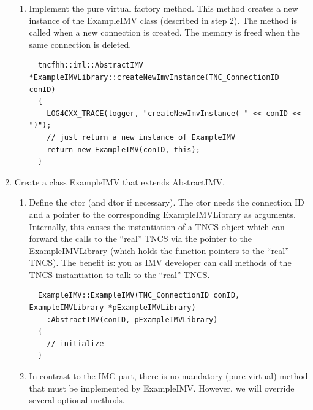 \documentclass[a4paper,10pt]{scrartcl}
\begin{document}
\begin{enumerate}
\begin{enumerate}
  \item Implement the pure virtual factory method. This method creates a new instance of
  the ExampleIMV class (described in step 2). The method is called when a new connection
  is created. The memory is freed when the same connection is deleted.
  \begin{lstlisting}
  tncfhh::iml::AbstractIMV *ExampleIMVLibrary::createNewImvInstance(TNC_ConnectionID conID)
  {
    LOG4CXX_TRACE(logger, "createNewImvInstance( " << conID << ")");
    // just return a new instance of ExampleIMV
    return new ExampleIMV(conID, this);
  }
  \end{lstlisting}
 \end{enumerate}

 \item Create a class ExampleIMV that extends AbstractIMV.
 \begin{enumerate}
  \item Define the ctor (and dtor if necessary). The ctor needs the connection ID and a pointer to the
  corresponding ExampleIMVLibrary as arguments. Internally, this causes the instantiation of a TNCS object
  which can forward the calls to the ``real'' TNCS via the pointer to the ExampleIMVLibrary (which holds the
  function pointers to the ``real'' TNCS). The benefit is: you as IMV developer can call methods of the TNCS
  instantiation to talk to the ``real'' TNCS.
  \begin{lstlisting}
  ExampleIMV::ExampleIMV(TNC_ConnectionID conID, ExampleIMVLibrary *pExampleIMVLibrary)
    :AbstractIMV(conID, pExampleIMVLibrary)
  {
    // initialize
  }
  \end{lstlisting}

  \item In contrast to the IMC part, there is no mandatory (pure virtual) method that must be implemented by ExampleIMV. However, we will
  override several optional methods.


\end{enumerate}
\end{enumerate}
\end{document}
